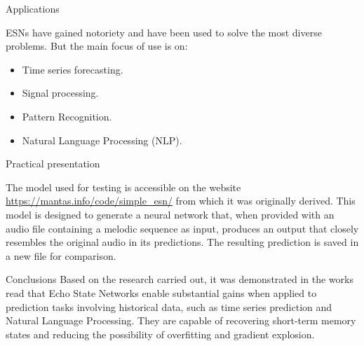 \begin{frame}{Applications}
	\par ESNs have gained notoriety and have been used to solve the most diverse problems. But the main focus of use is on:
	\begin{itemize}
		\item Time series forecasting.
		\item Signal processing.
		\item Pattern Recognition.
		\item Natural Language Processing (NLP).
	\end{itemize}
\end{frame}

\begin{frame}{Practical presentation}
	\par The model used for testing is accessible on the website \url{https://mantas.info/code/simple_esn/} \cite{2} from which it was originally derived. This model is designed to generate a neural network that, when provided with an audio file containing a melodic sequence as input, produces an output that closely resembles the original audio in its predictions. The resulting prediction is saved in a new file for comparison.
\end{frame}

\begin{frame}{Conclusions}\label{sec:conclusoes}
	Based on the research carried out, it was demonstrated in the works read that Echo State Networks enable substantial gains when applied to prediction tasks involving historical data, such as time series prediction and Natural Language Processing. They are capable of recovering short-term memory states and reducing the possibility of overfitting and gradient explosion.
\end{frame}
